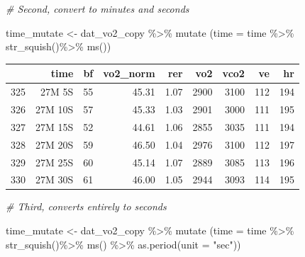 \documentclass[
]{book}
\newenvironment{Shaded}{\begin{snugshade}}{\end{snugshade}}
\newcommand{\AttributeTok}[1]{\textcolor[rgb]{0.77,0.63,0.00}{#1}}
\newcommand{\CommentTok}[1]{\textcolor[rgb]{0.56,0.35,0.01}{\textit{#1}}}
\newcommand{\FunctionTok}[1]{\textcolor[rgb]{0.00,0.00,0.00}{#1}}
\newcommand{\NormalTok}[1]{#1}
\newcommand{\OtherTok}[1]{\textcolor[rgb]{0.56,0.35,0.01}{#1}}
\newcommand{\SpecialCharTok}[1]{\textcolor[rgb]{0.00,0.00,0.00}{#1}}
\newcommand{\StringTok}[1]{\textcolor[rgb]{0.31,0.60,0.02}{#1}}
\begin{document}
\begin{Shaded}
\begin{Highlighting}[]
\CommentTok{\# Second, convert to minutes and seconds}

\NormalTok{time\_mutate }\OtherTok{\textless{}{-}}\NormalTok{ dat\_vo2\_copy }\SpecialCharTok{\%\textgreater{}\%}
  \FunctionTok{mutate}\NormalTok{ (}\AttributeTok{time =}\NormalTok{ time }\SpecialCharTok{\%\textgreater{}\%} 
                 \FunctionTok{str\_squish}\NormalTok{()}\SpecialCharTok{\%\textgreater{}\%}  
                 \FunctionTok{ms}\NormalTok{())}
\end{Highlighting}
\end{Shaded}

\begin{tabular}{l|r|r|r|r|r|r|r|r}
\hline
  & time & bf & vo2\_norm & rer & vo2 & vco2 & ve & hr\\
\hline
325 & 27M 5S & 55 & 45.31 & 1.07 & 2900 & 3100 & 112 & 194\\
\hline
326 & 27M 10S & 57 & 45.33 & 1.03 & 2901 & 3000 & 111 & 195\\
\hline
327 & 27M 15S & 52 & 44.61 & 1.06 & 2855 & 3035 & 111 & 194\\
\hline
328 & 27M 20S & 59 & 46.50 & 1.04 & 2976 & 3100 & 112 & 197\\
\hline
329 & 27M 25S & 60 & 45.14 & 1.07 & 2889 & 3085 & 113 & 196\\
\hline
330 & 27M 30S & 61 & 46.00 & 1.05 & 2944 & 3093 & 114 & 195\\
\hline
\end{tabular}

\begin{Shaded}
\begin{Highlighting}[]
\CommentTok{\# Third, converts entirely to seconds}

\NormalTok{time\_mutate }\OtherTok{\textless{}{-}}\NormalTok{ dat\_vo2\_copy }\SpecialCharTok{\%\textgreater{}\%}
  \FunctionTok{mutate}\NormalTok{ (}\AttributeTok{time =}\NormalTok{ time }\SpecialCharTok{\%\textgreater{}\%} 
                 \FunctionTok{str\_squish}\NormalTok{()}\SpecialCharTok{\%\textgreater{}\%}  
                 \FunctionTok{ms}\NormalTok{() }\SpecialCharTok{\%\textgreater{}\%}
                 \FunctionTok{as.period}\NormalTok{(}\AttributeTok{unit =} \StringTok{"sec"}\NormalTok{)) }
\end{Highlighting}
\end{Shaded}
\end{document}
